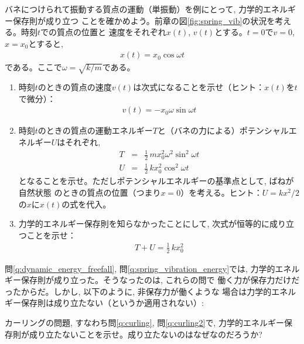%
\begin{q}\label{q:spring_vibration_energy}
バネにつけられて振動する質点の運動（単振動）を例にとって, 力学的エネルギー保存則が成り立つ
ことを確かめよう。前章の図\ref{fig:spring_vib}の状況を考える。時刻$t$での質点の位置と
速度をそれぞれ$x(t)$, $v(t)$とする。$t=0$で$v=0$, $x=x_0$とすると, 
\begin{eqnarray} 
x(t)=x_0\cos\omega t\label{eq:spring_vibration_energyx}
\end{eqnarray} 
である。ここで$\omega=\sqrt{k/m}$である。
\begin{enumerate}
\item 時刻$t$のときの質点の速度$v(t)$は次式になることを示せ（ヒント：$x(t)$を$t$で微分）：
\begin{eqnarray} 
v(t)=-x_0\omega\sin\omega t\label{eq:spring_vibration_energyv}
\end{eqnarray} 
\item 時刻$t$のときの質点の運動エネルギー$T$と（バネの力による）ポテンシャルエネルギー$U$はそれぞれ, 
\begin{eqnarray}
T&=&\frac{1}{2}\,mx_0^2\omega^2\sin^2\omega t\label{eq:spring_vibration_energyT}\\
U&=&\frac{1}{2}\,kx_0^2\cos^2\omega t\label{eq:spring_vibration_energyU}
\end{eqnarray}
となることを示せ。ただしポテンシャルエネルギーの基準点として, ばねが自然状態
のときの質点の位置（つまり$x=0$）を考える。ヒント：$U=kx^2/2$の$x$に$x(t)$の式を代入。
\item 力学的エネルギー保存則を知らなかったことにして, 次式が恒等的に成り立つことを示せ：
\begin{eqnarray} 
T+U=\frac{1}{2}\,kx_0^2
\end{eqnarray} 
\end{enumerate}
\end{q}

問\ref{q:dynamic_energy_freefall}, 問\ref{q:spring_vibration_energy}では, 
力学的エネルギー保存則が成り立った。そうなったのは, これらの問で
働く力が保存力だけだったからだ。しかし, 以下のように, 非保存力が働くような
場合は力学的エネルギー保存則は成り立たない（というか適用されない）:
\vspace{0.2cm}

\begin{q}\label{q:curling3} カーリングの問題, すなわち問\ref{q:curling}, 問\ref{q:curling2}で, 
力学的エネルギー保存則が成り立たないことを示せ。成り立たないのはなぜなのだろうか?
\end{q}
\vspace{0.2cm}




